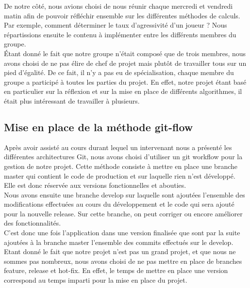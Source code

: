 \documentclass{report}
\begin{document}
De notre côté, nous avions choisi de nous réunir chaque mercredi et vendredi matin afin de pouvoir réfléchir ensemble sur les différentes méthodes de calculs. Par exemple, comment déterminer le taux d'agressivité d'un joueur ? Nous répartissions ensuite le contenu à implémenter entre les différents membres du groupe.\\

Étant donné le fait que notre groupe n'était composé que de trois membres, nous avons choisi de ne pas élire de chef de projet mais plutôt de travailler tous sur un pied d'égalité. De ce fait, il n'y a pas eu de spécialisation, chaque membre du groupe a participé à toutes les parties du projet. En effet, notre projet étant basé en particulier sur la réflexion et sur la mise en place de différents algorithmes, il était plus intéressant de travailler à plusieurs.\par

\subsection{Mise en place de la méthode git-flow}
\hspace{0.5cm}Après avoir assisté au cours durant lequel un intervenant nous a présenté les différentes architectures Git, nous avons choisi d'utiliser un git workflow pour la gestion de notre projet. Cette méthode consiste à mettre en place une branche master qui contient le code de production et sur laquelle rien n'est développé. Elle est donc réservée aux versions fonctionnelles et abouties.\\

Nous avons ensuite une branche develop sur laquelle sont ajoutées l'ensemble des modifications effectuées au cours du développement et le code qui sera ajouté pour la nouvelle release. Sur cette branche, on peut corriger ou encore améliorer des fonctionnalités. \\

C'est donc une fois l'application dans une version finalisée que sont par la suite ajoutées à la branche master l'ensemble des commits effectués sur le develop.\\

Etant donné le fait que notre projet n'est pas un grand projet, et que nous ne sommes pas nombreux, nous avons choisi de ne pas mettre en place de branches feature, release et hot-fix. En effet, le temps de mettre en place une version correspond au temps imparti pour la mise en place du projet.\\
\end{document}
